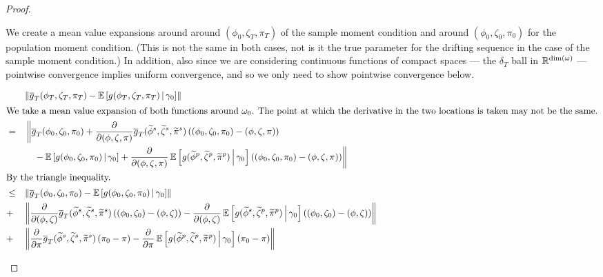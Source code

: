 \documentclass[11pt, letterpaper, twoside, final]{article}
\begin{document}
\begin{appendices}
\begin{proof}
\begin{proofpart}
    We create a mean value expansions around around $(\phi_0, \zeta_T, \pi_T)$ of the sample moment condition and
    around $(\phi_0, \zeta_0, \pi_0)$ for the population moment condition.
    (This is not the same in both cases, not is it the true parameter for the drifting sequence in the case of the
    sample moment condition.)
    In addition, also since we are considering continuous functions of compact spaces --- the $\delta_T$ ball in
    $\mathbb{R}^{\dim(\omega)}$ --- pointwise convergence implies uniform convergence, and so we only need to show pointwise
    convergence below.

    \begin{alignat}{2}
        & &&\norm*{\sampmom(\phi_T, \zeta_T, \pi_T) -  \E\left[\popmom(\phi_T, \zeta_T, \pi_T) \mvert
          \gamma_0\right] } \\ 
        \intertext{We take a mean value expansion of both functions around $\omega_0$. The point at which the
        derivative in the two locations is taken may not be the same.}
        &= &&\left\lVert \sampmom(\phi_0, \zeta_0, \pi_0) + \frac{\partial}{\partial (\phi, \zeta,
           \pi)}\sampmom(\widetilde{\phi}^s, \widetilde{\zeta}^s, \widetilde{\pi}^s)\left((\phi_0, \zeta_0, \pi_0)
            - (\phi, \zeta, \pi)\right)\right. \\
        &  &&\quad \left. - \E\left[\popmom(\phi_0, \zeta_0, \pi_0) \mvert \gamma_0\right] + 
           \frac{\partial}{\partial (\phi, \zeta, \pi)} \E\left[\popmom(\widetilde{\phi}^p, \widetilde{\zeta}^p,
           \widetilde{\pi}^p)\mvert \gamma_0\right] \left((\phi_0, \zeta_0, \pi_0) - (\phi, \zeta,
           \pi)\right) \right\rVert \\ 
        \intertext{By the triangle inequality.}
        &\leq && \norm*{\sampmom(\phi_0, \zeta_0, \pi_0) - \E\left[\popmom(\phi_0, \zeta_0, \pi_0) \mvert
           \gamma_0\right]}  \\
        &+  && \norm*{\frac{\partial}{\partial (\phi, \zeta)}\sampmom(\widetilde{\phi}^s, \widetilde{\zeta}^s,
          \widetilde{\pi}^s)\left((\phi_0, \zeta_0)  - (\phi, \zeta)\right) -  \frac{\partial}{\partial (\phi,
          \zeta)} \E\left[\popmom(\widetilde{\phi}^s, \widetilde{\zeta}^p, \widetilde{\pi}^p)\mvert \gamma_0\right]
          \left((\phi_0, \zeta_0) - (\phi, \zeta)\right)} \\
        &+  && \norm*{\frac{\partial}{\partial \pi}\sampmom(\widetilde{\phi}^s, \widetilde{\zeta}^s,
          \widetilde{\pi}^s)\left(\pi_0 - \pi\right) -  \frac{\partial}{\partial \pi}
          \E\left[\popmom(\widetilde{\phi}^p, \widetilde{\zeta}^p, \widetilde{\pi}^p)\mvert \gamma_0\right]
          \left(\pi_0 - \pi\right)} 
          \label{eqn:pi_derivative_term}
    \end{alignat}


\end{proofpart}
\end{proof}
\end{appendices}
\end{document}

